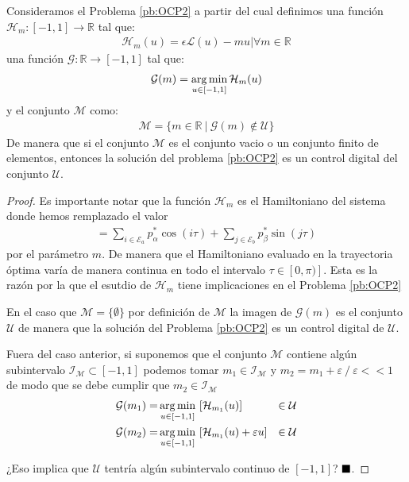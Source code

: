 \begin{proposition}
    Consideramos el Problema \ref{pb:OCP2} a partir del cual definimos una función $\mathcal{H}_m:[-1,1]\rightarrow \mathbb{R}$ tal que:
    \begin{gather}\label{Hm}
        \mathcal{H}_m(u) = \epsilon \mathcal{L}(u) - mu  |  \forall m \in \mathbb{R}
    \end{gather}
    una función $\mathcal{G}:\mathbb{R} \rightarrow [-1,1]$ tal que:
    \begin{gather}
        \mathcal{G}(m) = \operatorname*{arg\,min}_{u \in [-1,1]} \mathcal{H}_m(u)
    \end{gather}
    y  el conjunto $\mathcal{M}$ como:
    \begin{gather}
        \mathcal{M} = \{m \in \mathbb{R}\ | \ \mathcal{G}(m) \notin \mathcal{U} \}
    \end{gather}
    De manera que si el conjunto $\mathcal{M}$ es el conjunto vacio o un conjunto finito de elementos, entonces la solución del problema \ref{pb:OCP2} es un control digital del conjunto $\mathcal{U}$. 
\end{proposition}
\begin{proof}
Es importante notar que la función $\mathcal{H}_m$ es el Hamiltoniano del sistema donde hemos remplazado el valor 
\begin{gather}
	[\bm{p}^* \cdot \bm{\mathcal{D}}(\tau)] = \sum_{i \in \mathcal{E}_a} p^*_\alpha \cos(i\tau) + \sum_{j \in \mathcal{E}_b} p^*_\beta \sin(j\tau) 
\end{gather}
por el parámetro $m$. De manera que el Hamiltoniano evaluado en la trayectoria óptima varía de manera continua en todo el intervalo $\tau \in [0,\pi)]$. Esta es la razón por la que el esutdio de $\mathcal{H}_m$ tiene implicaciones en el Problema \ref{pb:OCP2}

En el caso que $\mathcal{M} = \{\emptyset\}$ por definición de $\mathcal{M}$ la imagen de $\mathcal{G}(m)$ es el conjunto $\mathcal{U}$ de manera que la solución del Problema \ref{pb:OCP2} es un control digital de $\mathcal{U}$.  

Fuera del caso anterior, si suponemos que el conjunto $\mathcal{M}$ contiene algún subintervalo $\mathcal{I}_{\mathcal{M}} \subset[-1,1]$ podemos tomar    $m_1 \in \mathcal{I}_{\mathcal{M}}$ y $ m_2 = m_1 + \varepsilon \ / \ \varepsilon << 1$ de modo que se debe cumplir que $m_2 \in \mathcal{I}_{\mathcal{M}}$
\begin{equation}
    \begin{aligned}
        \mathcal{G}(m_1) = & \argmin_{u\in[-1,1]} \ [\mathcal{H}_{m_1}(u)] & \in \mathcal{U}\\
        \mathcal{G}(m_2) = & \argmin_{u\in[-1,1]} \ [\mathcal{H}_{m_1}(u) + \varepsilon u]   & \in \mathcal{U} 
    \end{aligned}      
\end{equation}

¿Eso implica que $\mathcal{U}$ tentría algún subintervalo continuo de $[-1,1]$?
$\hfill\blacksquare$.
\end{proof} 

